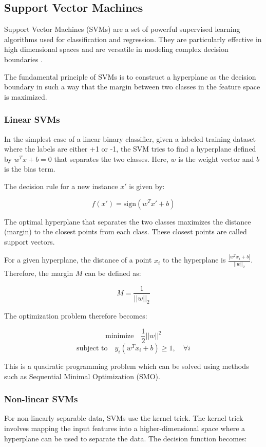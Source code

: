 \documentclass{cernatsnote}
\begin{document}
\subsection{Support Vector Machines}
Support Vector Machines (SVMs) are a set of powerful supervised learning algorithms used for classification and regression. They are particularly effective in high dimensional spaces and are versatile in modeling complex decision boundaries \cite{hearst1998support, bishop2006pattern}. 

The fundamental principle of SVMs is to construct a hyperplane as the decision boundary in such a way that the margin between two classes in the feature space is maximized. 

\subsubsection{Linear SVMs}
In the simplest case of a linear binary classifier, given a labeled training dataset where the labels are either +1 or -1, the SVM tries to find a hyperplane defined by \(w^T x + b = 0\) that separates the two classes. Here, \(w\) is the weight vector and \(b\) is the bias term. 

The decision rule for a new instance \(x'\) is given by:

\[
f(x') = \text{sign}(w^T x' + b)
\]

The optimal hyperplane that separates the two classes maximizes the distance (margin) to the closest points from each class. These closest points are called support vectors.

For a given hyperplane, the distance of a point \(x_i\) to the hyperplane is \( \frac{|w^T x_i + b|}{||w||_2} \). Therefore, the margin \(M\) can be defined as:

\[
M = \frac{1}{||w||_2}
\]

The optimization problem therefore becomes:

\[
\text{minimize} \quad \frac{1}{2} ||w||^2
\]
\[
\text{subject to} \quad y_i(w^T x_i + b) \geq 1, \quad \forall i
\]

This is a quadratic programming problem which can be solved using methods such as Sequential Minimal Optimization (SMO).

\subsubsection{Non-linear SVMs}
For non-linearly separable data, SVMs use the kernel trick. The kernel trick involves mapping the input features into a higher-dimensional space where a hyperplane can be used to separate the data. The decision function becomes:
\end{document}
